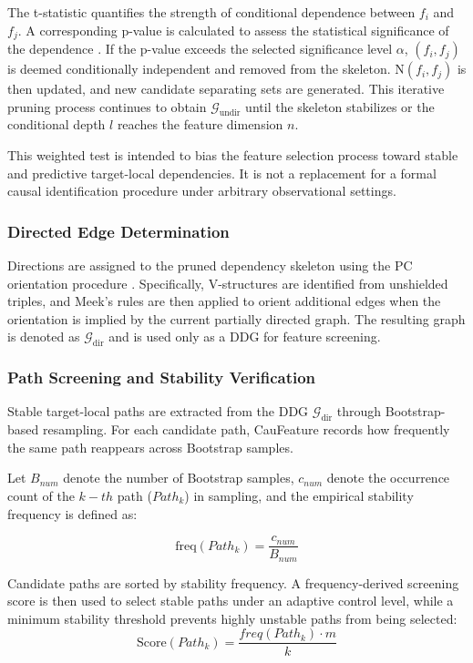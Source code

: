 \documentclass[journal]{IEEEtran}
\begin{document}
The t-statistic quantifies the strength of conditional dependence between \(f_i\) and \(f_j\). A corresponding p-value is calculated to assess the statistical significance of the dependence \cite{biau2010tp}. If the p-value exceeds the selected significance level \(\alpha\),  \((f_i, f_j)\) is deemed conditionally independent and removed from the skeleton. $\text{N}(f_i, f_j)$ is then updated, and new candidate separating sets are generated. This iterative pruning process continues to obtain $\mathcal{G}_{\text{undir}}$ until the skeleton stabilizes or the conditional depth $l$ reaches the feature dimension $n$. 

This weighted test is intended to bias the feature selection process toward stable and predictive target-local dependencies. It is not a replacement for a formal causal identification procedure under arbitrary observational settings.

\subsubsection{Directed Edge Determination}
Directions are assigned to the pruned dependency skeleton using the PC orientation procedure \cite{spirtes2000causation}. Specifically, V-structures are identified from unshielded triples, and Meek's rules are then applied to orient additional edges when the orientation is implied by the current partially directed graph. The resulting graph is denoted as \(\mathcal{G}_{\text{dir}}\) and is used only as a DDG for feature screening.

\subsubsection{Path Screening and Stability Verification}
Stable target-local paths are extracted from the DDG \(\mathcal{G}_{\text{dir}}\) through Bootstrap-based resampling. For each candidate path, CauFeature records how frequently the same path reappears across Bootstrap samples.

Let $B_{num}$ denote the number of Bootstrap samples, $c_{num}$ denote the occurrence count of the $k-th$ path ($Path_k$) in sampling, and the empirical stability frequency is defined as:

\begin{equation}
\text{freq}(Path_k) = \frac{c_{num}}{B_{num}}
\label{eq:stability_freq}
\end{equation}

Candidate paths are sorted by stability frequency. A frequency-derived screening score is then used to select stable paths under an adaptive control level, while a minimum stability threshold prevents highly unstable paths from being selected:
\begin{equation}
\text{Score}(Path_k) = \frac{freq(Path_k) \cdot m}{k}
\label{eq:freq_score_k}
\end{equation}
\end{document}
